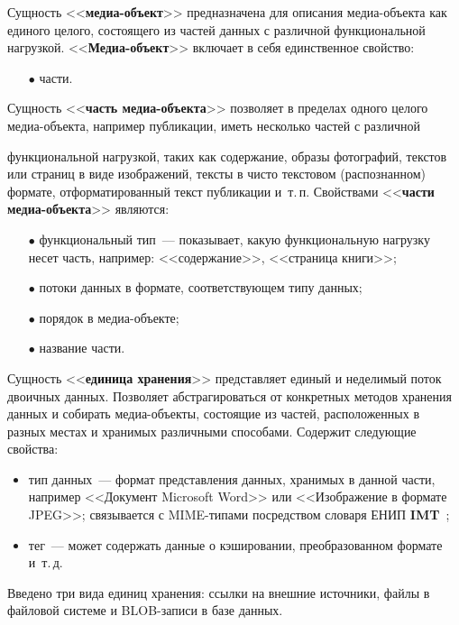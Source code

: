 \begin{multicols}{2}
  Сущность <<\textbf{медиа-объект}>> предназначена для описания медиа-объекта как 
единого целого, состоящего из частей данных с различной функциональной нагрузкой. 
<<\textbf{Медиа-объект}>> включает в себя единственное свойство:
  \begin{itemize}
  \item[$\bullet$] части.
  \end{itemize}
  
  Сущность <<\textbf{часть медиа-объекта}>> позволяет в пределах одного целого 
  медиа-объекта, например публикации, иметь несколько частей с различной\linebreak\vspace*{-12pt}
  
  \noindent
   функциональной 
нагрузкой, таких как содержание, образы фотографий, текстов или страниц в виде 
изображений, тексты в чисто текстовом (распознанном) формате, отформатированный текст 
пуб\-ли\-ка\-ции и~т.\,п. Свойствами <<\textbf{части медиа-объекта}>> являются:
  \begin{itemize}
  \item[$\bullet$] функциональный тип~--- показывает, какую функциональную нагрузку 
несет часть, например: <<содержание>>, <<страница книги>>;
  \item[$\bullet$] потоки данных в формате, соответствующем типу данных;
  \item[$\bullet$] порядок в медиа-объекте;
  \item[$\bullet$] название части.
\end{itemize}

  Сущность <<\textbf{единица хранения}>> представляет единый и неделимый поток 
двоичных данных. Позволяет абстрагироваться от конкретных методов хранения данных и 
собирать медиа-объекты, состоящие из частей, расположенных в разных местах и хранимых 
различными способами. Содержит следующие свойства:
  \begin{itemize}
\item тип данных~--- формат представления данных, хранимых в данной части, например <<Документ 
Microsoft Word>> или <<Изображение в формате JPEG>>; связывается с MIME-типами посредством 
словаря ЕНИП \textbf{IMT}~\cite{8ser};\\[-8pt]
\item тег~--- может содержать данные о кэшировании, преобразованном формате и~т.\,д.
\end{itemize}

  Введено три вида единиц хранения: ссылки на внешние источники, файлы в файловой 
системе и BLOB-записи в базе данных.
  

\end{multicols}
